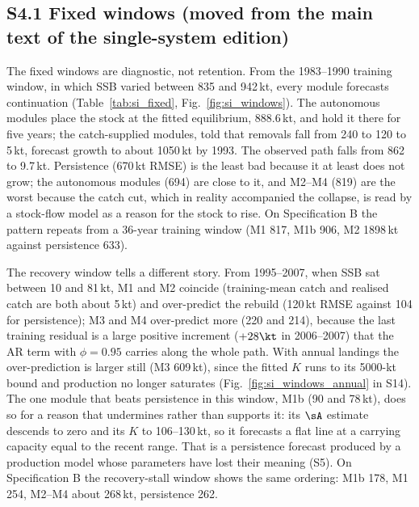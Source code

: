 \FloatBarrier
\subsection*{S4.1 Fixed windows (moved from the main text of the single-system edition)}

The fixed windows are diagnostic, not retention. From the 1983--1990 training window, in which SSB varied between 835 and 942\,kt, every module forecasts continuation (Table~\ref{tab:si_fixed}, Fig.~\ref{fig:si_windows}). The autonomous modules place the stock at the fitted equilibrium, 888.6\,kt, and hold it there for five years; the catch-supplied modules, told that removals fall from 240 to 120 to 5\,kt, forecast growth to about 1050\,kt by 1993. The observed path falls from 862 to 9.7\,kt. Persistence (670\,kt RMSE) is the least bad because it at least does not grow; the autonomous modules (694) are close to it, and M2--M4 (819) are the worst because the catch cut, which in reality accompanied the collapse, is read by a stock-flow model as a reason for the stock to rise. On Specification B the pattern repeats from a 36-year training window (M1 817, M1b 906, M2 1898\,kt against persistence 633).

The recovery window tells a different story. From 1995--2007, when SSB sat between 10 and 81\,kt, M1 and M2 coincide (training-mean catch and realised catch are both about 5\,kt) and over-predict the rebuild (120\,kt RMSE against 104 for persistence); M3 and M4 over-predict more (220 and 214), because the last training residual is a large positive increment ($+28\kt$ in 2006--2007) that the AR term with $\phi=0.95$ carries along the whole path. With annual landings the over-prediction is larger still (M3 609\,kt), since the fitted $K$ runs to its 5000-kt bound and production no longer saturates (Fig.~\ref{fig:si_windows_annual} in S14). The one module that beats persistence in this window, M1b (90 and 78\,kt), does so for a reason that undermines rather than supports it: its $\sA$ estimate descends to zero and its $K$ to 106--130\,kt, so it forecasts a flat line at a carrying capacity equal to the recent range. That is a persistence forecast produced by a production model whose parameters have lost their meaning (S5). On Specification B the recovery-stall window shows the same ordering: M1b 178, M1 254, M2--M4 about 268\,kt, persistence 262.

